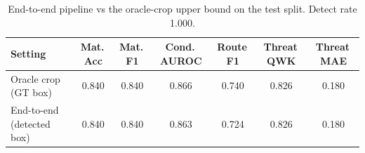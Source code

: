 \begin{table}[t]
\centering
\caption{End-to-end pipeline vs the oracle-crop upper bound on the test split. Detect rate 1.000.}
\label{tab:end_to_end}
\begin{tabular}{lcccccc}
\toprule
Setting & Mat.\,Acc & Mat.\,F1 & Cond.\,AUROC & Route\,F1 & Threat\,QWK & Threat\,MAE \\
\midrule
Oracle crop (GT box) & 0.840 & 0.840 & 0.866 & 0.740 & 0.826 & 0.180 \\
End-to-end (detected box) & 0.840 & 0.840 & 0.863 & 0.724 & 0.826 & 0.180 \\
\bottomrule
\end{tabular}
\end{table}